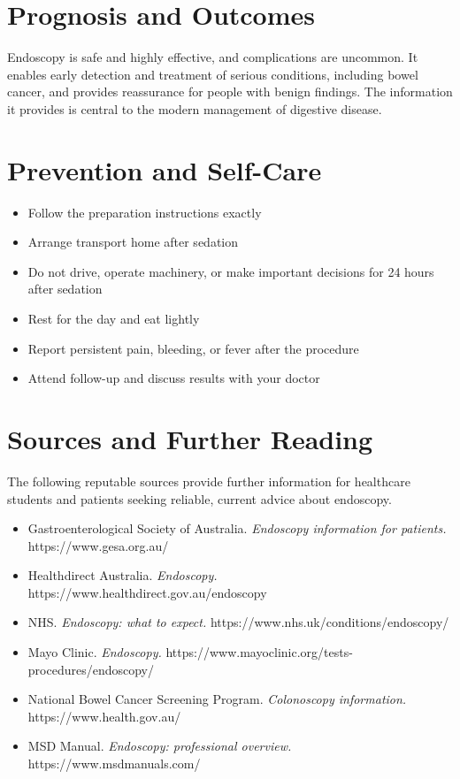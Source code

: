 \section*{Prognosis and Outcomes}
Endoscopy is safe and highly effective, and complications are uncommon. It enables early detection and treatment of serious conditions, including bowel cancer, and provides reassurance for people with benign findings. The information it provides is central to the modern management of digestive disease.

\section*{Prevention and Self-Care}
\begin{itemize}
    \item Follow the preparation instructions exactly
    \item Arrange transport home after sedation
    \item Do not drive, operate machinery, or make important decisions for 24 hours after sedation
    \item Rest for the day and eat lightly
    \item Report persistent pain, bleeding, or fever after the procedure
    \item Attend follow-up and discuss results with your doctor
\end{itemize}

\section*{Sources and Further Reading}
The following reputable sources provide further information for healthcare students and patients seeking reliable, current advice about endoscopy.
\begin{itemize}
    \item Gastroenterological Society of Australia. \textit{Endoscopy information for patients.} https://www.gesa.org.au/
    \item Healthdirect Australia. \textit{Endoscopy.} https://www.healthdirect.gov.au/endoscopy
    \item NHS. \textit{Endoscopy: what to expect.} https://www.nhs.uk/conditions/endoscopy/
    \item Mayo Clinic. \textit{Endoscopy.} https://www.mayoclinic.org/tests-procedures/endoscopy/
    \item National Bowel Cancer Screening Program. \textit{Colonoscopy information.} https://www.health.gov.au/
    \item MSD Manual. \textit{Endoscopy: professional overview.} https://www.msdmanuals.com/
\end{itemize}
